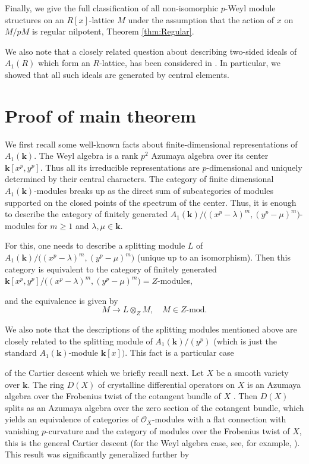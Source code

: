 \documentclass[12pt,letterpaper]{amsart}
\theoremstyle{plain}
\theoremstyle{definition}
\begin{document}
    
 Finally, 
we give the full classification of all non-isomorphic $p$-Weyl module structures on an $R[x]$-lattice $M$
under the assumption that the action of $x$ on $M/pM$ is regular nilpotent, Theorem \ref{thm:Regular}.

We also note that a closely related question about describing two-sided ideals of $A_1(R)$  which form an $R$-lattice, has been considered in
\cite{T}. In particular, we showed that all such ideals are generated by central elements.






\section{Proof of main theorem}

We first recall some well-known facts about finite-dimensional representations of $A_1(\mathbf{k})$. The Weyl algebra
is a rank $p^2$ Azumaya algebra over its center $\mathbf{k}[x^p, y^p]$.  Thus all its irreducible representations are $p$-dimensional
and uniquely determined by their central characters. The category of finite dimensional $A_1(\mathbf{k})$-modules breaks up as the direct sum of subcategories of modules supported on the closed points of the spectrum of the center. Thus, it is enough to describe
the category of finitely generated $A_1(\mathbf{k})/\big((x^{p}-\lambda)^m,(y^{p}-\mu)^m\big)$-modules for $m\geq 1$ and $\lambda, \mu\in \mathbf{k}$.

For this, one needs to describe a splitting module $L$ of $A_1(\mathbf{k})/\big((x^{p}-\lambda)^m, (y^{p}-\mu)^m\big)$ (unique up to an isomorphism). Then
this category is equivalent to the category of finitely generated $\mathbf{k}[x^p, y^p]/\big((x^p-\lambda)^m,(y^p-\mu)^m\big)=Z$-modules,

and the equivalence is given by
$$M\to L\otimes_Z M,\quad M \in Z\text{-mod}.$$ 

We also note that the descriptions of the splitting modules mentioned above are closely related to the splitting module
of $A_1(\mathbf{k})/(y^p)$  (which is just the standard $A_1(\mathbf{k})$-module $\mathbf{k}[x])$.  This fact is a particular case

of the Cartier descent which we briefly recall next. Let $X$ be a smooth variety over $\mathbf{k}$. The ring $D(X)$ of crystalline differential operators on $X$
is an Azumaya algebra over the Frobenius twist of the cotangent bundle of $X$ \cite{BMR}.
Then $D(X)$ splits as an Azumaya algebra over the zero section of the cotangent bundle, which yields
 an equivalence of categories of $\mathcal{O}_X$-modules with a flat connection with vanishing
$p$-curvature and the category of modules over the Frobenius twist of $X$,
this is the general Cartier descent (for the Weyl algebra case, see, for example, \cite[Lemma~2.3]{Ts}). This result was significantly generalized further by
\end{document}
